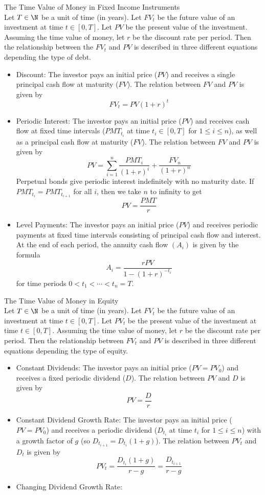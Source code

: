 \documentclass[a4paper]{article}
\begin{document}
\begin{cpt}{The Time Value of Money in Fixed Income Instruments}{}\\
Let $T\in\N$ be a unit of time (in years). Let $FV_t$ be the future value of an investment at time $t\in[0,T]$. Let $PV$ be the present value of the investment. Assuming the time value of money, let $r$ be the discount rate per period. Then the relationship between the $FV_t$ and $PV$ is described in three different equations depending the type of debt. 
\begin{itemize}
\item Discount: The investor pays an initial price ($PV$) and receives a single principal cash flow at maturity ($FV$). The relation between $FV$ and $PV$ is given by $$FV_t=PV(1+r)^t$$
\item Periodic Interest: The investor pays an initial price ($PV$) and receives cash flow at fixed time intervals ($PMT_{t_i}$ at time $t_i\in[0,T]$ for $1\leq i\leq n$), as well as a principal cash flow at maturity ($FV$). The relation between $FV$ and $PV$ is given by $$PV=\sum_{i=1}^n\frac{PMT_i}{(1+r)^i}+\frac{FV_n}{(1+r)^n}$$ Perpetual bonds give periodic interest indefinitely with no maturity date. If $PMT_{t_i}=PMT_{t_{i+1}}$ for all $i$, then we take $n$ to infinity to get $$PV=\frac{PMT}{r}$$
\item Level Payments: The investor pays an initial price ($PV$) and receives periodic payments at fixed time intervals consisting of principal cash flow and interest. At the end of each period, the annuity cash flow $(A_i)$ is given by the formula $$A_i=\frac{rPV}{1-(1+r)^{-t_i}}$$ for time periods $0<t_1<\cdots<t_n=T$. 
\end{itemize}
\end{cpt}

\begin{cpt}{The Time Value of Money in Equity}{}\\
Let $T\in\N$ be a unit of time (in years). Let $FV_t$ be the future value of an investment at time $t\in[0,T]$. Let $PV_t$ be the present value of the investment at time $t\in[0,T]$. Assuming the time value of money, let $r$ be the discount rate per period. Then the relationship between $FV_t$ and $PV$ is described in three different equations depending the type of equity. 
\begin{itemize}
\item Constant Dividends: The investor pays an initial price ($PV=PV_0$) and receives a fixed periodic dividend ($D$). The relation between $PV$ and $D$ is given by $$PV=\frac{D}{r}$$
\item Constant Dividend Growth Rate: The investor pays an initial price ($PV=PV_0$) and receives a periodic dividend ($D_{t_i}$ at time $t_i$ for $1\leq i\leq n$) with a growth factor of $g$ (so $D_{t_{i+1}}=D_{t_i}(1+g)$). The relation between $PV_t$ and $D_t$ is given by $$PV_t=\frac{D_{t_i}(1+g)}{r-g}=\frac{D_{t_{i+1}}}{r-g}$$
\item Changing Dividend Growth Rate: 
\end{itemize}
\end{cpt}
\end{document}
